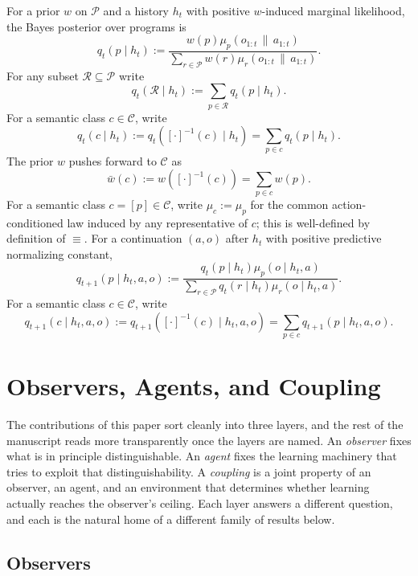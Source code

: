 \documentclass[11pt]{article}
\theoremstyle{definition}
\theoremstyle{remark}
\newcommand{\Ccal}{\mathcal{C}}
\newcommand{\Pcal}{\mathcal{P}}
\newcommand{\Rcal}{\mathcal{R}}
\newcommand{\givena}{\,\|\,}
\begin{document}
For a prior $w$ on $\Pcal$ and a history $h_t$ with positive $w$-induced marginal likelihood, the Bayes posterior over programs is
\[
q_t(p\mid h_t)
:=
\frac{w(p)\mu_p(o_{1:t}\givena a_{1:t})}
{\sum_{r\in\Pcal} w(r)\mu_r(o_{1:t}\givena a_{1:t})}.
\]
For any subset $\Rcal\subseteq\Pcal$ write
\[
q_t(\Rcal\mid h_t):=\sum_{p\in\Rcal} q_t(p\mid h_t).
\]
For a semantic class $c\in\Ccal$, write
\[
q_t(c\mid h_t):=q_t([\cdot]^{-1}(c)\mid h_t)=\sum_{p\in c} q_t(p\mid h_t).
\]
The prior $w$ pushes forward to $\Ccal$ as
\[
\bar w(c):=w([\cdot]^{-1}(c))=\sum_{p\in c}w(p).
\]
For a semantic class $c=[p]\in\Ccal$, write $\mu_c:=\mu_p$ for the common action-conditioned law induced by any representative of $c$; this is well-defined by definition of $\equiv$.
For a continuation $(a,o)$ after $h_t$ with positive predictive normalizing constant,
\[
q_{t+1}(p\mid h_t,a,o)
:=
\frac{q_t(p\mid h_t)\mu_p(o\mid h_t,a)}
{\sum_{r\in\Pcal} q_t(r\mid h_t)\mu_r(o\mid h_t,a)}.
\]
For a semantic class $c\in\Ccal$, write
\[
q_{t+1}(c\mid h_t,a,o):=q_{t+1}([\cdot]^{-1}(c)\mid h_t,a,o)=\sum_{p\in c} q_{t+1}(p\mid h_t,a,o).
\]

%

\section{Observers, Agents, and Coupling}
\label{sec:ontology}

The contributions of this paper sort cleanly into three layers, and the rest of the manuscript reads more transparently once the layers are named. An \emph{observer} fixes what is in principle distinguishable. An \emph{agent} fixes the learning machinery that tries to exploit that distinguishability. A \emph{coupling} is a joint property of an observer, an agent, and an environment that determines whether learning actually reaches the observer's ceiling. Each layer answers a different question, and each is the natural home of a different family of results below.

\subsection{Observers}
\label{sec:ontology-observers}
\end{document}
